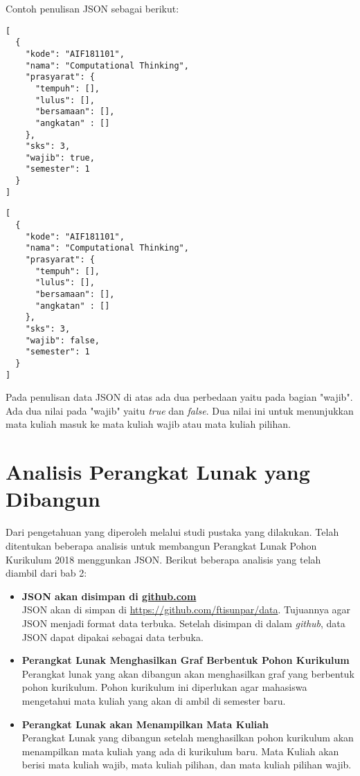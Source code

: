Contoh penulisan JSON sebagai berikut:
\begin{lstlisting}
[
  {
    "kode": "AIF181101",
    "nama": "Computational Thinking",
    "prasyarat": {
      "tempuh": [],
      "lulus": [],
      "bersamaan": [],
      "angkatan" : []
    },
    "sks": 3,
    "wajib": true,
    "semester": 1
  }
]
\end{lstlisting}

\begin{lstlisting}
[
  {
    "kode": "AIF181101",
    "nama": "Computational Thinking",
    "prasyarat": {
      "tempuh": [],
      "lulus": [],
      "bersamaan": [],
      "angkatan" : []
    },
    "sks": 3,
    "wajib": false,
    "semester": 1
  }
]
\end{lstlisting}

Pada penulisan data JSON di atas ada dua perbedaan yaitu pada bagian "wajib". Ada dua nilai pada "wajib" yaitu \textit{true} dan \textit{false}. Dua nilai ini untuk menunjukkan mata kuliah masuk ke mata kuliah wajib atau mata kuliah pilihan. 

\section{Analisis Perangkat Lunak yang Dibangun}
\label{sec: Analisis Perangkat Lunak yang Dibangun}
Dari pengetahuan yang diperoleh melalui studi pustaka yang dilakukan. Telah ditentukan beberapa analisis untuk membangun Perangkat Lunak Pohon Kurikulum 2018 menggunkan JSON. Berikut beberapa analisis yang telah diambil dari bab 2: 
\begin{itemize}

\item \textbf{JSON akan disimpan di \url{github.com}}\\
JSON akan di simpan di \url{https://github.com/ftisunpar/data}. Tujuannya agar JSON menjadi format data terbuka. Setelah disimpan di dalam \textit{github}, data JSON dapat dipakai sebagai data terbuka.

\item \textbf{Perangkat Lunak Menghasilkan Graf Berbentuk Pohon Kurikulum}\\
Perangkat lunak yang akan dibangun akan menghasilkan graf yang berbentuk pohon kurikulum. Pohon kurikulum ini diperlukan agar mahasiswa mengetahui mata kuliah yang akan di ambil di semester baru. 

\item \textbf{Perangkat Lunak akan Menampilkan Mata Kuliah}\\
Perangkat Lunak yang dibangun setelah menghasilkan pohon kurikulum akan menampilkan mata kuliah yang ada di kurikulum baru. Mata Kuliah akan berisi mata kuliah wajib, mata kuliah pilihan, dan mata kuliah pilihan wajib.
\end{itemize}

